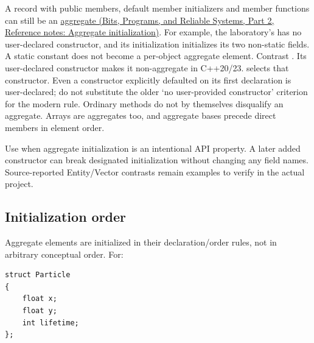 A record with public members, default member initializers and member functions can still be an \href{../01-Bits-Programs-and-Reliable-Systems-P02/main.pdf\#appendix-b7174c179542}{aggregate (Bits, Programs, and Reliable Systems, Part 2, Reference notes: Aggregate initialization)}. For example, the laboratory's  has no user-declared constructor, and its  initialization initializes its two non-static fields. A static constant does not become a per-object aggregate element. Contrast . Its user-declared constructor makes it non-aggregate in C++20/23.  selects that constructor. Even a constructor explicitly defaulted on its first declaration is user-declared; do not substitute the older `no user-provided constructor' criterion for the modern rule. Ordinary methods do not by themselves disqualify an aggregate. Arrays are aggregates too, and aggregate bases precede direct members in element order.

Use  when aggregate initialization is an intentional API property. A later added constructor can break designated initialization without changing any field names. Source-reported Entity/Vector contrasts remain examples to verify in the actual project.

\subsection{Initialization order}\label{05-engine-i-ch003-initialization-order}

\hypertarget{05-engine-i-ch003-initialization-order}{}

Aggregate elements are initialized in their declaration/order rules, not in arbitrary conceptual order. For:

\begin{verbatim}
struct Particle
{
    float x;
    float y;
    int lifetime;
};
\end{verbatim}

